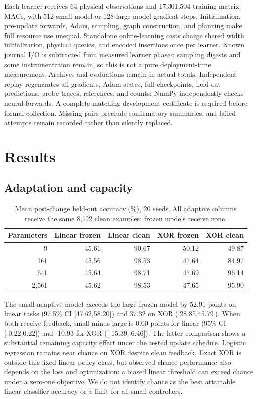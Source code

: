\documentclass[11pt]{article}
\begin{document}
Each learner receives 64 physical observations and 17,301,504 training-matrix
MACs, with 512 small-model or 128 large-model gradient steps. Initialization,
pre-update forwards, Adam, sampling, graph construction, and planning make
full resource use unequal. Standalone online-learning costs charge shared
width initialization, physical queries, and encoded insertions once per
learner. Known journal I/O is subtracted from measured learner phases;
sampling digests and some instrumentation remain, so this is not a pure
deployment-time measurement. Archives and evaluations remain in actual totals.
Independent replay regenerates all gradients, Adam states, full checkpoints,
held-out predictions, probe traces, references, and counts; NumPy independently
checks neural forwards. A complete matching development certificate is required
before formal collection. Missing pairs preclude confirmatory summaries, and
failed attempts remain recorded rather than silently replaced.

\section{Results}
\subsection{Adaptation and capacity}
\begin{table}[ht]
\centering
\caption{Mean post-change held-out accuracy (\%), 20 seeds. All adaptive
columns receive the same 8,192 clean examples; frozen models receive none.}
\begin{tabular}{r r r r r}
\toprule
Parameters & Linear frozen & Linear clean & XOR frozen & XOR clean\\
\midrule
9 & 45.61 & 90.67 & 50.12 & 49.87\\
161 & 45.56 & 98.53 & 47.64 & 84.97\\
641 & 45.64 & 98.71 & 47.69 & 96.14\\
2,561 & 45.62 & 98.53 & 47.65 & 95.90\\
\bottomrule
\end{tabular}
\end{table}

The small adaptive model exceeds the large frozen model by 52.91 points on
linear tasks (97.5\% CI [47.62,58.20]) and 37.32 on XOR ([28.85,45.79]).
When both receive feedback, small-minus-large is 0.00 points for linear
(95\% CI [-0.22,0.22]) and -10.93 for XOR ([-15.39,-6.46]). The latter
comparison shows a substantial remaining capacity effect under the tested
update schedule. Logistic regression remains near chance on XOR despite clean
feedback. Exact XOR is outside this fixed linear policy class, but observed
chance performance also depends on the loss and optimization: a biased linear
threshold can exceed chance under a zero-one objective. We do not identify
chance as the best attainable linear-classifier accuracy or a limit for all
small controllers.
\end{document}
